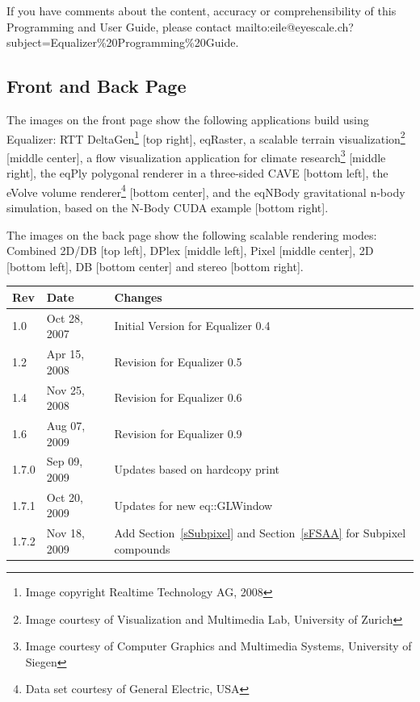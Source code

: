 \documentclass[10pt,a4]{scrartcl}
\newcommand{\sref}[1]{Section~\ref{#1}}
\begin{document}
If you have comments about the content, accuracy or comprehensibility of
this Programming and User Guide, please contact
{mailto:eile@eyescale.ch?subject=Equalizer\%20Programming\%20Guide}.

\vfill

\subsection*{Front and Back Page}

The images on the front page show the following applications build using
Equalizer: 
RTT DeltaGen\footnote{Image copyright Realtime Technology AG, 2008} [top
right], 
\textsf{eqRaster}, a scalable terrain visualization\footnote{Image
  courtesy of Visualization and Multimedia Lab, University of Zurich}
[middle center],
a flow visualization application for climate research\footnote{Image
  courtesy of Computer Graphics and Multimedia Systems, University of
  Siegen} [middle right],
the \textsf{eqPly} polygonal renderer in a three-sided CAVE [bottom
left],
the \textsf{eVolve} volume renderer\footnote{Data set courtesy of
  General Electric, USA} [bottom center],
and the \textsf{eqNBody} gravitational n-body simulation, based on the
N-Body CUDA example [bottom right].

The images on the back page show the following scalable rendering modes:
Combined 2D/DB [top left], DPlex [middle left], Pixel [middle center],
2D [bottom left], DB [bottom center] and stereo [bottom right].

\clearpage
{}
\pagestyle{headings}
\tableofcontents
\listoffigures \vfill{\center\begin{tabularx}{\textwidth}{|l|l|X|}
    \hline
    \bf Rev & \bf Date     & \bf Changes \\
    \hline
    1.0     & Oct 28, 2007 & Initial Version for Equalizer 0.4\\
    1.2     & Apr 15, 2008 & Revision for Equalizer 0.5\\
    1.4     & Nov 25, 2008 & Revision for Equalizer 0.6\\
    1.6     & Aug 07, 2009 & Revision for Equalizer 0.9\\
    1.7.0   & Sep 09, 2009 & Updates based on hardcopy print\\
    1.7.1   & Oct 20, 2009 & Updates for new eq::GLWindow\\
    1.7.2   & Nov 18, 2009 & Add \sref{sSubpixel} and \sref{sFSAA} for Subpixel compounds\\
    \hline
  \end{tabularx}}
\clearpage
\end{document}
